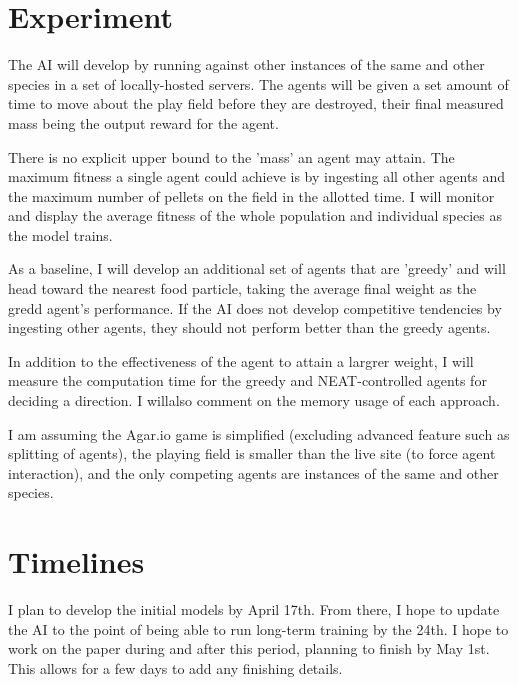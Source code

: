 \documentclass[11pt]{article}
\begin{document}
\section*{Experiment}

The AI will develop by running against other instances of the same and other species in a set of locally-hosted servers. The agents will be given a set amount of time to move about the play field before they are destroyed, their final measured mass being the output reward for the agent.

There is no explicit upper bound to the 'mass' an agent may attain. The maximum fitness a single agent could achieve is by ingesting all other agents and the maximum number of pellets on the field in the allotted time. I will monitor and display the average fitness of the whole population and individual species as the model trains.

As a baseline, I will develop an additional set of agents that are 'greedy' and will head toward the nearest food particle, taking the average final weight as the gredd agent's performance. If the AI does not develop competitive tendencies by ingesting other agents, they should not perform better than the greedy agents.

In addition to the effectiveness of the agent to attain a largrer weight, I will measure the computation time for the greedy and NEAT-controlled agents for deciding a direction. I willalso comment on the memory usage of each approach. 

I am assuming the Agar.io game is simplified (excluding advanced feature such as splitting of agents), the playing field is smaller than the live site (to force agent interaction), and the only competing agents are instances of the same and other species.

\section*{Timelines}

I plan to develop the initial models by April 17th. From there, I hope to update the AI to the point of being able to run long-term training by the 24th. I hope to work on the paper during and after this period, planning to finish by May 1st. This allows for a few days to add any finishing details.


% 

\end{document}
